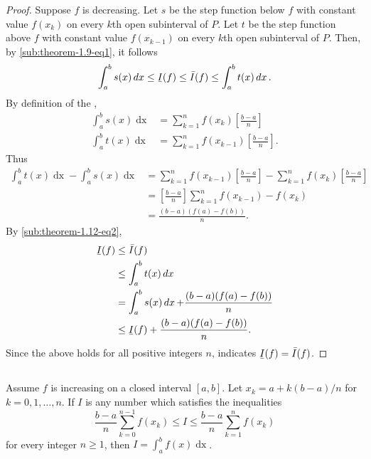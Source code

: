 \documentclass{report}
\begin{document}
\begin{proof}
    Suppose $f$ is decreasing.
    Let $s$ be the step function below $f$ with constant value $f(x_k)$
      on every $k$th open subinterval of $P$.
    Let $t$ be the step function above $f$ with constant value $f(x_{k-1})$
      on every $k$th open subinterval of $P$.
    Then, by \eqref{sub:theorem-1.9-eq1}, it follows
      \begin{equation}
        \label{sub:theorem-1.12-eq2}
        \int_a^b s(x) \mathop{dx} \leq \ubar{I}(f)
          \leq \bar{I}(f) \leq \int_a^b t(x) \mathop{dx}.
      \end{equation}
    By definition of the ,
      \begin{align*}
        \int_a^b s(x) \mathop{dx}
          & = \sum_{k=1}^n f(x_k)\left[\frac{b - a}{n}\right] \\
        \int_a^b t(x) \mathop{dx}
          & = \sum_{k=1}^n f(x_{k-1})\left[\frac{b - a}{n}\right].
      \end{align*}
    Thus
      \begin{align*}
        \int_a^b t(x) \mathop{dx} - \int_a^b s(x) \mathop{dx}
          & = \sum_{k=1}^n f(x_{k-1})\left[\frac{b - a}{n}\right] -
              \sum_{k=1}^n f(x_k)\left[\frac{b - a}{n}\right] \\
          & = \left[\frac{b - a}{n}\right] \sum_{k=1}^n f(x_{k-1}) - f(x_k) \\
          & = \frac{(b - a)(f(a) - f(b))}{n}.
      \end{align*}
    By \eqref{sub:theorem-1.12-eq2},
      \begin{align*}
        \ubar{I}(f)
          & \leq \bar{I}(f) \\
          & \leq \int_a^b t(x) \mathop{dx} \\
          & = \int_a^b s(x) \mathop{dx} + \frac{(b - a)(f(a) - f(b))}{n} \\
          & \leq \ubar{I}(f) + \frac{(b - a)(f(a) - f(b))}{n}.
      \end{align*}
    Since the above holds for all positive integers $n$,
       indicates $\ubar{I}(f) = \bar{I}(f)$.

\end{proof}

\subsection{}%
\label{sub:theorem-1.13}

\begin{theorem}[1.13]

  Assume $f$ is increasing on a closed interval $[a, b]$.
  Let $x_k = a + k(b - a) / n$ for $k = 0, 1, \ldots, n$.
  If $I$ is any number which satisfies the inequalities
    \begin{equation}
      \label{sub:theorem-1.13-eq1}
      \frac{b - a}{n} \sum_{k=0}^{n-1} f(x_k)
        \leq I \leq
        \frac{b - a}{n} \sum_{k=1}^n f(x_k)
    \end{equation}
    for every integer $n \geq 1$, then $I = \int_a^b f(x) \mathop{dx}$.

\end{theorem}
\end{document}
